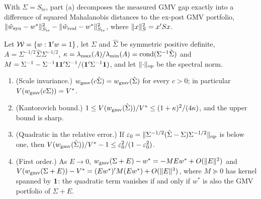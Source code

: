 With $\Sigma=S_{\mathrm{te}}$, part (a) decomposes the measured GMV gap exactly into a difference
of squared Mahalanobis distances to the ex-post GMV portfolio,
$\lVert\hat w_{\mathrm{syn}}-w^*\rVert_{S_{\mathrm{te}}}^2-\lVert\hat w_{\mathrm{real}}-w^*\rVert_{S_{\mathrm{te}}}^2$,
where $\lVert x\rVert_S^2=x'Sx$.

\begin{proposition}\label{prop:gmv-sensitivity}
Let $\mathcal W=\{w:\mathbf{1}'w=1\}$, let $\Sigma$ and $\hat\Sigma$ be symmetric positive definite,
$A=\Sigma^{-1/2}\hat\Sigma\Sigma^{-1/2}$, $\kappa=\lambda_{\max}(A)/\lambda_{\min}(A)=\operatorname{cond}(\Sigma^{-1}\hat\Sigma)$
and $M=\Sigma^{-1}-\Sigma^{-1}\mathbf{1}\mathbf{1}'\Sigma^{-1}/(\mathbf{1}'\Sigma^{-1}\mathbf{1})$, and let
$\lVert\cdot\rVert_{\mathrm{op}}$ be the spectral norm.
\begin{enumerate}
  \item[(a)] (Scale invariance.) $w_{\mathrm{gmv}}(c\hat\Sigma)=w_{\mathrm{gmv}}(\hat\Sigma)$ for every $c>0$; in
  particular $V(w_{\mathrm{gmv}}(c\Sigma))=V^*$.
  \item[(b)] (Kantorovich bound.) $1\le V(w_{\mathrm{gmv}}(\hat\Sigma))/V^*\le(1+\kappa)^2/(4\kappa)$, and the
  upper bound is sharp.
  \item[(c)] (Quadratic in the relative error.) If $\varepsilon_0=\lVert\Sigma^{-1/2}(\hat\Sigma-\Sigma)\Sigma^{-1/2}\rVert_{\mathrm{op}}$
  is below one, then $V(w_{\mathrm{gmv}}(\hat\Sigma))/V^*-1\le\varepsilon_0^2/(1-\varepsilon_0^2)$.
  \item[(d)] (First order.) As $E\to0$, $w_{\mathrm{gmv}}(\Sigma+E)-w^*=-MEw^*+O(\lVert E\rVert^2)$ and
  $V(w_{\mathrm{gmv}}(\Sigma+E))-V^*=(Ew^*)'M(Ew^*)+O(\lVert E\rVert^3)$, where $M\succeq0$ has kernel spanned by
  $\mathbf{1}$: the quadratic term vanishes if and only if $w^*$ is also the GMV portfolio of $\Sigma+E$.
\end{enumerate}
\end{proposition}

